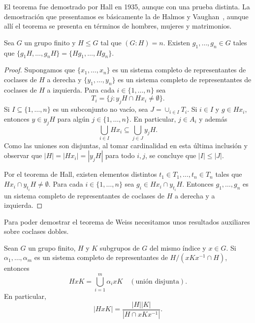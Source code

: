 El teorema fue demostrado por Hall en 1935, aunque con una prueba distinta. La demostración que
presentamos es básicamente la de Halmos y Vaughan~\cite{MR33330}, aunque allí el teorema se presenta en términos de 
hombres, mujeres y matrimonios. 

\begin{theorem}[Hall]
Sea $G$ un grupo finito y $H\leq G$ tal que $(G:H)=n$. Existen $g_1,\dots,g_n\in G$ tales que
$\{g_1H,\dots,g_nH\}=\{Hg_1,\dots,Hg_n\}$.
\end{theorem}

\begin{proof}
     Supongamos que $\{x_1,\dots,x_n\}$ es un sistema completo de representantes de coclases de $H$ a derecha y 
     $\{y_1,\dots,y_n\}$ es un sistema completo de representantes de coclases de $H$ a izquierda. Para
     cada $i\in\{1,\dots,n\}$ sea 
     \[
     T_i=\{j:y_jH\cap Hx_i\ne\emptyset\}.
     \]
     Si $I\subseteq\{1,\dots,n\}$ es un subconjunto no vacío, sea $J=\cup_{i\in I}T_i$. Si $i\in I$ y $g\in Hx_i$, entonces
     $y\in y_jH$ para algún $j\in\{1,\dots,n\}$. En particular, $j\in A_i$ y además 
     \[
     \bigcup_{i\in I}Hx_i\subseteq\bigcup_{j\in J}y_jH.
     \]
     Como las uniones son disjuntas, al tomar cardinalidad en esta última inclusión y observar que $|H|=|Hx_i|=|y_jH|$ para todo $i,j$, se concluye que
     $|I|\leq |J|$. 

    Por el teorema de Hall, existen elementos distintos $t_1\in T_1,\dots,t_n\in T_n$ tales que $Hx_i\cap y_{t_i}H\ne\emptyset$. Para cada $i\in\{1,\dots,n\}$ sea 
    $g_i\in Hx_i\cap y_{t_i}H$. Entonces $g_1,\dots,g_n$ es un sistema completo de representantes de coclases de $H$ a derecha y a izquierda.
\end{proof}

Para poder demostrar el teorema de Weiss 
necesitamos unos resultados auxiliares sobre coclases dobles. 

\begin{lemma}
     Sean $G$ un grupo finito, 
     $H$ y $K$ subgrupos de $G$ del mismo índice y $x\in G$. Si $\alpha_1,\dots,\alpha_m$ es
     un sistema completo de representantes de $H/(xKx^{-1}\cap H)$, entonces
     \begin{equation}
         \label{eq:Weiss}
         HxK=\bigcup_{i=1}^m\alpha_ixK\quad(\text{unión disjunta}).
     \end{equation}
     En particular, 
     \[
     |HxK|=\frac{|H||K|}{|H\cap xKx^{-1}|}.
     \]
\end{lemma}

